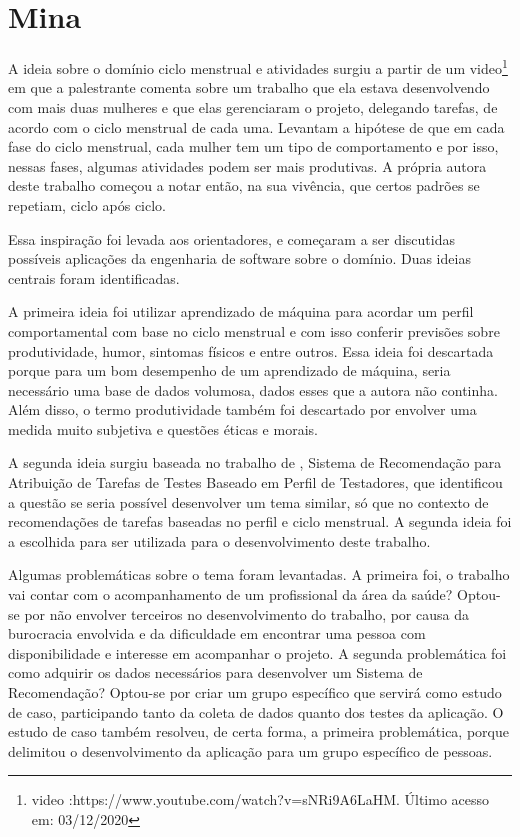 \chapter[Mina]{Mina}
\label{ch:mina}

A ideia sobre o domínio ciclo menstrual e atividades surgiu a 
partir de um video\footnote{video :https://www.youtube.com/watch?v=sNRi9A6LaHM. Último acesso em: 03/12/2020} 
em que a palestrante comenta sobre um 
trabalho que ela estava desenvolvendo com mais duas  
mulheres e que elas gerenciaram o projeto, delegando tarefas, de 
acordo com o ciclo menstrual de cada uma. Levantam a hipótese de 
que em cada fase do ciclo menstrual, cada mulher tem um tipo 
de comportamento e por isso, nessas fases, algumas atividades 
podem ser mais produtivas.
A própria autora deste trabalho começou a notar então, na sua 
vivência, que certos padrões se repetiam, ciclo após ciclo.

Essa inspiração foi levada aos 
orientadores, e começaram a ser discutidas possíveis aplicações da 
engenharia de software sobre o domínio. Duas ideias centrais 
foram identificadas. 

A primeira ideia foi utilizar aprendizado de máquina para 
acordar um perfil comportamental com base no ciclo menstrual e 
com isso conferir previsões sobre produtividade, humor, sintomas 
físicos e entre outros. Essa ideia foi descartada porque para 
um bom desempenho de um aprendizado de máquina, seria necessário 
uma base de dados volumosa, dados esses que 
a autora não continha. Além disso, o termo produtividade também 
foi descartado por envolver uma medida muito subjetiva e questões éticas e morais. 

A segunda ideia surgiu baseada no trabalho de , Sistema de Recomendação para Atribuição de Tarefas de Testes 
Baseado em Perfil de Testadores, que identificou a questão se seria 
possível desenvolver um tema similar, só que no
contexto de recomendações de tarefas baseadas no perfil e 
ciclo menstrual. A segunda ideia foi a escolhida para ser 
utilizada para o desenvolvimento deste trabalho.

Algumas problemáticas sobre o tema foram levantadas. A primeira 
foi, o trabalho vai contar com o acompanhamento de um 
profissional da área da saúde? Optou-se por não envolver 
terceiros no desenvolvimento do trabalho, por causa da 
burocracia envolvida e da dificuldade 
em encontrar uma pessoa com disponibilidade e interesse em 
acompanhar o projeto. A segunda problemática foi 
como adquirir os dados necessários para desenvolver um 
Sistema de Recomendação? Optou-se por criar um grupo 
específico que servirá como estudo de caso, participando tanto 
da coleta de dados quanto dos testes da aplicação. O estudo de 
caso também resolveu, de certa forma, a primeira problemática, 
porque delimitou o desenvolvimento da aplicação para um grupo 
específico de pessoas.


